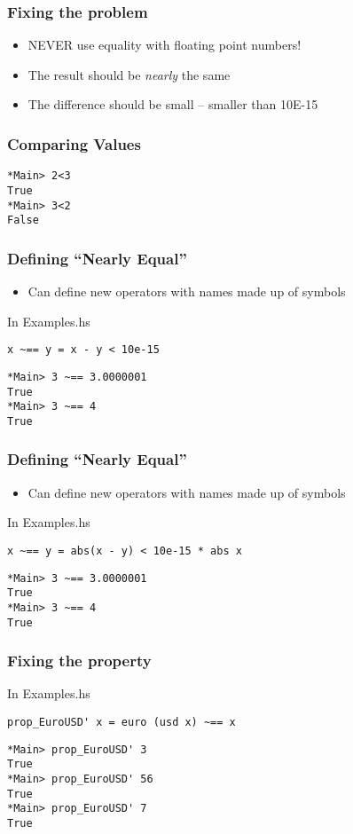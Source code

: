 \documentclass{beamer}
\begin{document}
\begin{frame}
  \frametitle{Fixing the problem}
  \begin{itemize}
  \item NEVER use equality with floating point numbers!
  \item  The result should be \emph{nearly} the same 
  \item  The difference should be small – smaller than 10E-15
  \end{itemize}
\end{frame}
\begin{frame}[fragile]
  \frametitle{Comparing Values}
\begin{verbatim}
*Main> 2<3
True
*Main> 3<2
False
\end{verbatim}
\end{frame}
\begin{frame}[fragile]
  \frametitle{Defining ``Nearly Equal''}
  \begin{itemize}
  \item Can define new operators with names made up of symbols
  \end{itemize}
\begin{block}{In Examples.hs}
\begin{verbatim}
x ~== y = x - y < 10e-15
\end{verbatim}
  \end{block}
\begin{verbatim}
*Main> 3 ~== 3.0000001
True
*Main> 3 ~== 4
True
\end{verbatim}
\end{frame}
\begin{frame}
  \frametitle{Defining ``Nearly Equal''}
  \begin{itemize}
  \item Can define new operators with names made up of symbols
  \end{itemize}
\begin{block}{In Examples.hs}
\begin{verbatim}
x ~== y = abs(x - y) < 10e-15 * abs x
\end{verbatim}
  \end{block}
\begin{verbatim}
*Main> 3 ~== 3.0000001
True
*Main> 3 ~== 4
True
\end{verbatim}
\end{frame}
\begin{frame}[fragile]
  \frametitle{Fixing the property}
\begin{block}{In Examples.hs}
\begin{verbatim}
prop_EuroUSD' x = euro (usd x) ~== x
\end{verbatim}
  \end{block}
\begin{verbatim}
*Main> prop_EuroUSD' 3
True
*Main> prop_EuroUSD' 56
True
*Main> prop_EuroUSD' 7
True
\end{verbatim}
\end{frame}
\end{document}
